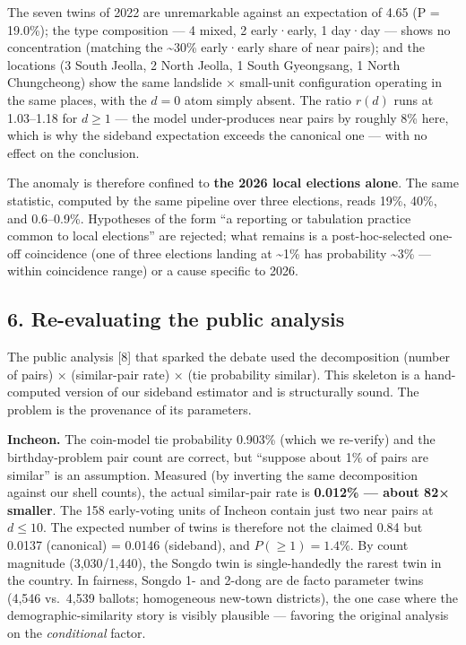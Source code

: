 \documentclass[
  11pt,
]{article}
\begin{document}
The seven twins of 2022 are unremarkable against an expectation of 4.65
(P = 19.0\%); the type composition --- 4 mixed, 2 early·early, 1 day·day
--- shows no concentration (matching the \textasciitilde30\% early·early
share of near pairs); and the locations (3 South Jeolla, 2 North Jeolla,
1 South Gyeongsang, 1 North Chungcheong) show the same landslide ×
small-unit configuration operating in the same places, with the
\(d = 0\) atom simply absent. The ratio \(r(d)\) runs at 1.03--1.18 for
\(d \ge 1\) --- the model under-produces near pairs by roughly 8\% here,
which is why the sideband expectation exceeds the canonical one --- with
no effect on the conclusion.

The anomaly is therefore confined to \textbf{the 2026 local elections
alone}. The same statistic, computed by the same pipeline over three
elections, reads 19\%, 40\%, and 0.6--0.9\%. Hypotheses of the form ``a
reporting or tabulation practice common to local elections'' are
rejected; what remains is a post-hoc-selected one-off coincidence (one
of three elections landing at \textasciitilde1\% has probability
\textasciitilde3\% --- within coincidence range) or a cause specific to
2026.

\subsection{6. Re-evaluating the public
analysis}\label{re-evaluating-the-public-analysis}

The public analysis {[}8{]} that sparked the debate used the
decomposition (number of pairs) × (similar-pair rate) × (tie probability
\textbar{} similar). This skeleton is a hand-computed version of our
sideband estimator and is structurally sound. The problem is the
provenance of its parameters.

\textbf{Incheon.} The coin-model tie probability 0.903\% (which we
re-verify) and the birthday-problem pair count are correct, but
``suppose about 1\% of pairs are similar'' is an assumption. Measured
(by inverting the same decomposition against our shell counts), the
actual similar-pair rate is \textbf{0.012\% --- about 82× smaller}. The
158 early-voting units of Incheon contain just two near pairs at
\(d \le 10\). The expected number of twins is therefore not the claimed
0.84 but 0.0137 (canonical) = 0.0146 (sideband), and
\(P(\ge 1) = 1.4\%\). By count magnitude (3,030/1,440), the Songdo twin
is single-handedly the rarest twin in the country. In fairness, Songdo
1- and 2-dong are de facto parameter twins (4,546 vs.~4,539 ballots;
homogeneous new-town districts), the one case where the
demographic-similarity story is visibly plausible --- favoring the
original analysis on the \emph{conditional} factor.
\end{document}
